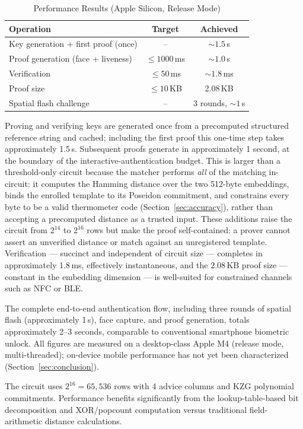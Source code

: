 \documentclass[conference]{IEEEtran}
\begin{document}
\begin{table}[t]
\centering
\caption{Performance Results (Apple Silicon, Release Mode)}
\label{tab:performance}
\begin{tabular}{@{}lcc@{}}
\toprule
Operation & Target & Achieved \\
\midrule
Key generation + first proof (once) & -- & ${\sim}1.5$\,s \\
Proof generation (face + liveness) & $\leq 1000$\,ms & ${\sim}1.0$\,s \\
Verification & $\leq 50$\,ms & ${\sim}1.8$\,ms \\
Proof size & $\leq 10$\,KB & 2.08\,KB \\
Spatial flash challenge & -- & 3 rounds, ${\sim}1$\,s \\
\bottomrule
\end{tabular}
\end{table}

Proving and verifying keys are generated once from a precomputed structured reference string and cached; including the first proof this one-time step takes approximately 1.5\,s. Subsequent proofs generate in approximately 1 second, at the boundary of the interactive-authentication budget. This is larger than a threshold-only circuit because the matcher performs \emph{all} of the matching in-circuit: it computes the Hamming distance over the two 512-byte embeddings, binds the enrolled template to its Poseidon commitment, and constrains every byte to be a valid thermometer code (Section~\ref{sec:accuracy}), rather than accepting a precomputed distance as a trusted input. These additions raise the circuit from $2^{14}$ to $2^{16}$ rows but make the proof self-contained: a prover cannot assert an unverified distance or match against an unregistered template. Verification --- succinct and independent of circuit size --- completes in approximately 1.8\,ms, effectively instantaneous, and the 2.08\,KB proof size --- constant in the embedding dimension --- is well-suited for constrained channels such as NFC or BLE.

The complete end-to-end authentication flow, including three rounds of spatial flash (approximately 1\,s), face capture, and proof generation, totals approximately 2--3 seconds, comparable to conventional smartphone biometric unlock. All figures are measured on a desktop-class Apple M4 (release mode, multi-threaded); on-device mobile performance has not yet been characterized (Section~\ref{sec:conclusion}).

The circuit uses $2^{16} = 65{,}536$ rows with 4 advice columns and KZG polynomial commitments. Performance benefits significantly from the lookup-table-based bit decomposition and XOR/popcount computation versus traditional field-arithmetic distance calculations.
\end{document}
